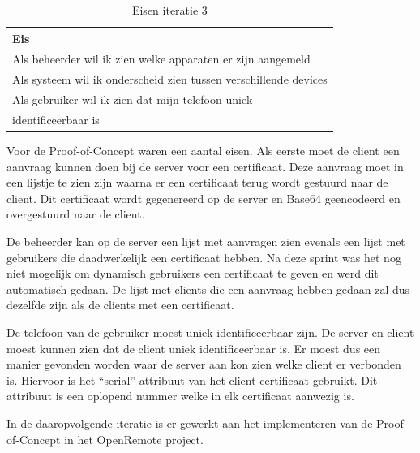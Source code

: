 \documentclass[]{article}
\begin{document}
\begin{table}[htpb]
  \caption{Eisen iteratie 3}
  \begin{center}
    \begin{tabular}{|| l ||}\hline
        Eis                                                              \\\hline\hline
        Als beheerder wil ik zien welke apparaten er zijn aangemeld      \\\hline
        Als systeem wil ik onderscheid zien tussen verschillende devices \\\hline
        Als gebruiker wil ik zien dat mijn telefoon uniek                \\ 
        identificeerbaar is                                              \\\hline
    \end{tabular}                                                         
  \end{center}                                                            
\end{table}                                                               

Voor de Proof-of-Concept waren een aantal eisen. Als eerste moet de client
een aanvraag kunnen doen bij de server voor een certificaat. Deze aanvraag
moet in een lijstje te zien zijn waarna er een certificaat terug wordt
gestuurd naar de client. Dit certificaat wordt gegenereerd op de server en
Base64 geencodeerd en overgestuurd naar de client.

De beheerder kan op de server een lijst met aanvragen zien evenals een
lijst met gebruikers die daadwerkelijk een certificaat hebben. Na deze
sprint was het nog niet mogelijk om dynamisch gebruikers een certificaat te
geven en werd dit automatisch gedaan. De lijst met clients die een aanvraag
hebben gedaan zal dus dezelfde zijn als de clients met een certificaat.

De telefoon van de gebruiker moest uniek identificeerbaar zijn. De server
en client moest kunnen zien dat de client uniek identificeerbaar is. Er
moest dus een manier gevonden worden waar de server aan kon zien welke
client er verbonden is. Hiervoor is het ``serial'' attribuut van het client
certificaat gebruikt. Dit attribuut is een oplopend nummer welke in elk
certificaat aanwezig is.

In de daaropvolgende iteratie is er gewerkt aan het implementeren van de
Proof-of-Concept in het OpenRemote project.
\end{document}
